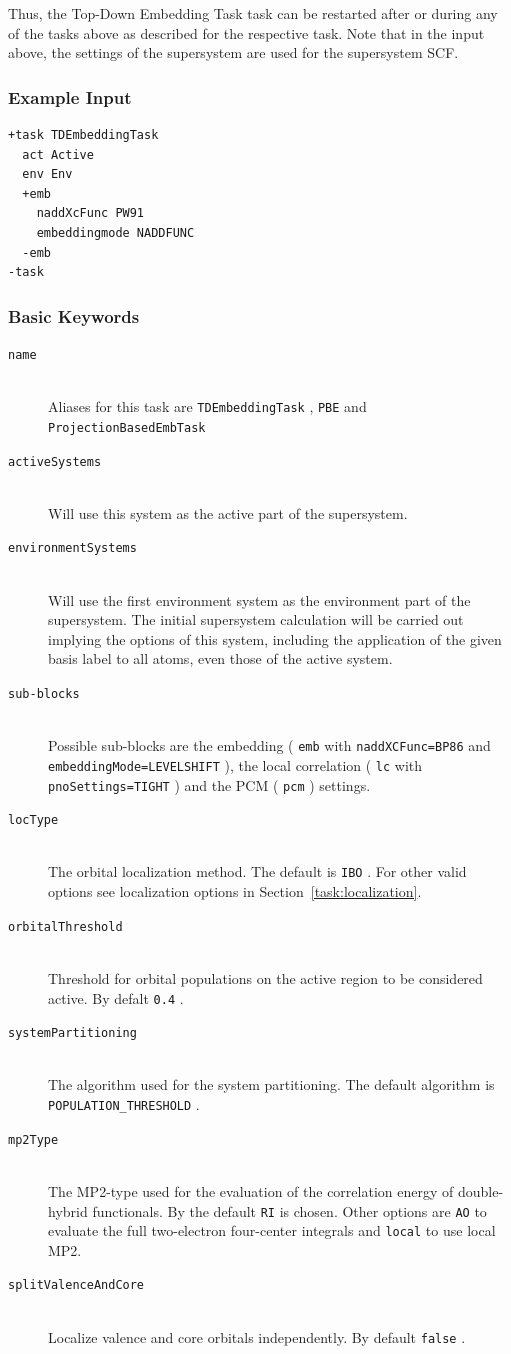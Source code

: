 \documentclass[bibliography=totocnumbered,a4paper,10pt,oneside]{scrbook}
\newcommand{\ttt}[1]{%
  \begingroup\setlength{\fboxsep}{1pt}%
  \colorbox{serenity-green!30}{\texttt{\hspace*{2pt}\vphantom{(g}#1\hspace*{2pt}}}%
  \endgroup
}
\begin{document}
Thus, the Top-Down Embedding Task task can be restarted after or during any of the tasks above as described for the respective task. Note that in the input above, the settings of the supersystem are used for the supersystem
SCF.

\subsubsection{Example Input}
\begin{lstlisting}
+task TDEmbeddingTask
  act Active
  env Env
  +emb
    naddXcFunc PW91
    embeddingmode NADDFUNC
  -emb
-task
\end{lstlisting}
\subsubsection{Basic Keywords}
\begin{description}
	\item[\texttt{name}]\hfill \\
	Aliases for this task are \ttt{TDEmbeddingTask}, \ttt{PBE} and \ttt{ProjectionBasedEmbTask}
	\item[\texttt{activeSystems}]\hfill \\
	Will use this system as the active part of the supersystem.
	\item[\texttt{environmentSystems}]\hfill \\
	Will use the first environment system as the environment part of the supersystem.
	The initial supersystem calculation will be carried out implying the options
	of this system, including the application of the given basis label to all atoms,
	even those of the active system.
	\item[\texttt{sub-blocks}]\hfill \\
	Possible sub-blocks are the embedding (\ttt{emb} with \ttt{naddXCFunc=BP86} and \ttt{embeddingMode=LEVELSHIFT}), the local correlation (\ttt{lc} with \ttt{pnoSettings=TIGHT}) and the PCM (\ttt{pcm}) settings.
	\item[\texttt{locType}]\hfill \\
	The orbital localization method. The default is \ttt{IBO}. For other valid options see localization options in Section~\ref{task:localization}.
	\item[\texttt{orbitalThreshold}]\hfill \\
	Threshold for orbital populations on the active region to be considered active. By defalt \ttt{0.4}.
	\item[\texttt{systemPartitioning}]\hfill \\
	The algorithm used for the system partitioning. The default algorithm is \ttt{POPULATION\_THRESHOLD}.
	\item[\texttt{mp2Type}]\hfill \\
	The MP2-type used for the evaluation of the correlation energy of double-hybrid functionals. By the default \ttt{RI} is chosen. Other options are \ttt{AO} to evaluate the full two-electron four-center integrals and \ttt{local} to use local MP2.
	\item[\texttt{splitValenceAndCore}]\hfill \\
	Localize valence and core orbitals independently. By default \ttt{false}.
\end{description}
\end{document}
